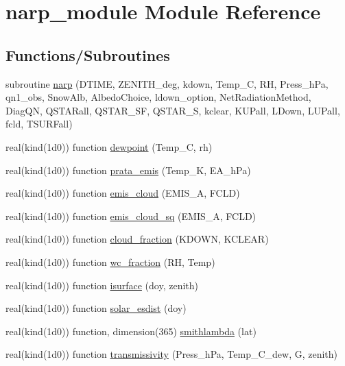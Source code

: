 \hypertarget{namespacenarp__module}{}\section{narp\+\_\+module Module Reference}
\label{namespacenarp__module}
\subsection*{Functions/\+Subroutines}
\begin{DoxyCompactItemize}
\item 
subroutine \hyperlink{namespacenarp__module_ac480c3115a6413b9e79770f601e68895}{narp} (D\+T\+I\+ME, Z\+E\+N\+I\+T\+H\+\_\+deg, kdown, Temp\+\_\+C, RH, Press\+\_\+h\+Pa, qn1\+\_\+obs, Snow\+Alb, Albedo\+Choice, ldown\+\_\+option, Net\+Radiation\+Method, Diag\+QN, Q\+S\+T\+A\+Rall, Q\+S\+T\+A\+R\+\_\+\+SF, Q\+S\+T\+A\+R\+\_\+S, kclear, K\+U\+Pall, L\+Down, L\+U\+Pall, fcld, T\+S\+U\+R\+Fall)
\item 
real(kind(1d0)) function \hyperlink{namespacenarp__module_a29289ed438f8c8f40bb9cafd90c8f87c}{dewpoint} (Temp\+\_\+C, rh)
\item 
real(kind(1d0)) function \hyperlink{namespacenarp__module_acfe7f0cf64c053bc528f54bde3ce8194}{prata\+\_\+emis} (Temp\+\_\+K, E\+A\+\_\+h\+Pa)
\item 
real(kind(1d0)) function \hyperlink{namespacenarp__module_aa7b0905bdc9e31e2a01ef14da0f281d5}{emis\+\_\+cloud} (E\+M\+I\+S\+\_\+A, F\+C\+LD)
\item 
real(kind(1d0)) function \hyperlink{namespacenarp__module_a51caa7fe09922df4896ec5e4b7c564a8}{emis\+\_\+cloud\+\_\+sq} (E\+M\+I\+S\+\_\+A, F\+C\+LD)
\item 
real(kind(1d0)) function \hyperlink{namespacenarp__module_a94b9c5403af8719752cf8b8f995cd207}{cloud\+\_\+fraction} (K\+D\+O\+WN, K\+C\+L\+E\+AR)
\item 
real(kind(1d0)) function \hyperlink{namespacenarp__module_a1774d32db350c89aad964f2f45ceb46e}{wc\+\_\+fraction} (RH, Temp)
\item 
real(kind(1d0)) function \hyperlink{namespacenarp__module_a67c38c5ffd466f983c36961a978ca980}{isurface} (doy, zenith)
\item 
real(kind(1d0)) function \hyperlink{namespacenarp__module_ada3ea94f7e9dc6f9fc5bc22c4b1d8a68}{solar\+\_\+esdist} (doy)
\item 
real(kind(1d0)) function, dimension(365) \hyperlink{namespacenarp__module_a2855b93202c40f690a05a6febcdc8067}{smithlambda} (lat)
\item 
real(kind(1d0)) function \hyperlink{namespacenarp__module_aeae3a1e345682a38338ecdf71bcf1c8e}{transmissivity} (Press\+\_\+h\+Pa, Temp\+\_\+\+C\+\_\+dew, G, zenith)
\end{DoxyCompactItemize}


